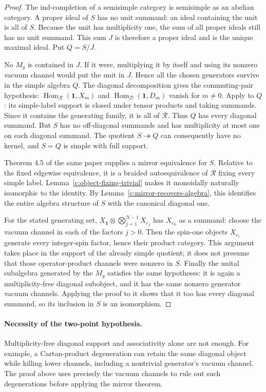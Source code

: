 \documentclass[11pt,a4paper]{article}
\numberwithin{equation}{section}
\theoremstyle{definition}\newtheorem{definition}[theorem]{Definition}
\theoremstyle{remark}\newtheorem{remark}[theorem]{Remark}
\begin{document}
\begin{proof}
The ind-completion of a semisimple category is semisimple as an abelian
category.  A proper ideal of $S$ has no unit summand: an ideal containing
the unit is all of $S$.  Because the unit has multiplicity one, the sum of
all proper ideals still has no unit summand.  This sum $J$ is therefore a
proper ideal and is the unique maximal ideal.  Put $Q=S/J$.

No $M_g$ is contained in $J$.  If it were, multiplying it by itself and
using its nonzero vacuum channel would put the unit in $J$.  Hence all the
chosen generators survive in the simple algebra $Q$.  The diagonal decomposition gives the commuting-pair hypothesis:
$\operatorname{Hom}_{\mathcal R}(\mathbf1,X_m)$ and
$\operatorname{Hom}_{\mathcal D}(\mathbf1,D_m)$ vanish for $m\ne0$.  Apply
\cite[Proposition 4.4]{gluing} to $Q$: its simple-label support
is closed under tensor products and taking summands.  Since it contains
the generating family, it is all of $\mathcal R$.  Thus $Q$ has every
diagonal summand.  But $S$ has no off-diagonal summands and has multiplicity
at most one on each diagonal summand.  The quotient $S\twoheadrightarrow Q$
can consequently have no kernel, and $S=Q$ is simple with full support.

Theorem 4.5 of the same paper supplies a mirror equivalence for $S$.
Relative to the fixed edgewise equivalence, it is a braided autoequivalence
of $\mathcal R$ fixing every simple label.  Lemma~\ref{c:object-fixing-trivial}
makes it monoidally naturally isomorphic to the identity.  By
Lemma~\ref{c:mirror-recovers-algebra}, this identifies the entire algebra
structure of $S$ with the canonical diagonal one.

For the stated generating set, $X_{\mathbf1}\otimes
\bigotimes_{j=1}^{N-1}X_{e_j}$ has $X_{e_0}$ as a summand: choose the
vacuum channel in each of the factors $j>0$.  Then the spin-one objects
$X_{e_i}$ generate every integer-spin factor, hence their product category.
This argument takes place in the support of the already simple quotient;
it does not presume that those operator-product channels were nonzero in $S$.
Finally the unital subalgebra generated by the $M_g$ satisfies the same
hypotheses: it is again a multiplicity-free diagonal subobject, and it has
the same nonzero generator vacuum channels.  Applying the proof to it shows
that it too has every diagonal summand, so its inclusion in $S$ is an
isomorphism.
\end{proof}

\paragraph{Necessity of the two-point hypothesis.}
Multiplicity-free diagonal support and associativity alone are not enough.
For example, a Cartan-product degeneration can retain the same diagonal
object while killing lower channels, including a nontrivial generator's
vacuum channel.  The proof above uses precisely the vacuum channels to rule
out such degenerations before applying the mirror theorem.
\end{document}
